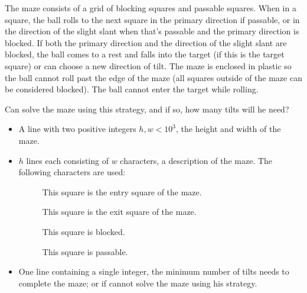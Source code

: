 The maze consists of a grid of blocking squares and passable squares.  When in a square, the ball rolls to the next square in the primary direction if passable, or in the direction of the slight slant when that's passable and the primary direction is blocked.  If both the primary direction and the direction of the slight slant are blocked, the ball comes to a rest and falls into the target (if this is the target square) or {\mazename} can choose a new direction of tilt.  The maze is enclosed in plastic so the ball cannot roll past the edge of the maze (all squares outside of the maze can be considered blocked).  The ball cannot enter the target while rolling.

Can {\mazename} solve the maze using this strategy, and if so, how many tilts will he need?


\Input
\begin{itemize}
 \item A line with two positive integers $h,w< 10^3$, the height and width of the maze.
 \item $h$ lines each consisting of $w$ characters, a description of the maze. The following characters are used:
	\begin{description}
		\item[] This square is the entry square of the maze.
		\item[] This square is the exit square of the maze.
		\item[] This square is blocked.
		\item[] This square is passable.
	\end{description}
\end{itemize}

\Output
\begin{itemize}
 \item One line containing a single integer, the minimum number of tilts {\mazename} needs to complete the maze; or  if {\mazename} cannot solve the maze using his strategy.
\end{itemize}

\Example

